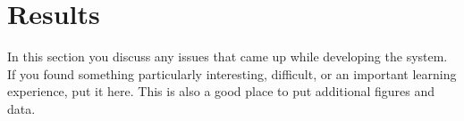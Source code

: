 \chapter{Results}

In this section you discuss any issues that came up while developing
the system.  If you found something particularly interesting,
difficult, or an important learning experience, put it here.  This is
also a good place to put additional figures and data.

\lipsum[28-34]

